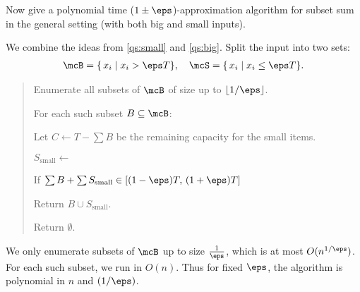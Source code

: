 \documentclass{article}
\begin{document}
\begin{subexercise}
  Now give a polynomial time ($ 1\pm \eps $)-approximation algorithm for subset sum in the general setting (with both big and small inputs).
\end{subexercise}

\begin{solution}
  We combine the ideas from \ref{qs:small} and \ref{qs:big}.
  Split the input into two sets:
  \begin{align*}
    \mcB = \{\,x_i \mid x_i > \eps T\}, \quad \mcS = \{\,x_i \mid x_i \le \eps T\}.
  \end{align*}

  \begin{quote}

  \begin{steps}
    \item Enumerate all subsets of $\mcB$ of size up to $\lfloor 1/\eps \rfloor$.
    \item For each such subset $B \subseteq \mcB$:
    \begin{steps}
      \item Let $C \leftarrow T - \sum B$ be the remaining capacity for the small items.
      \item $ S_{\text{small}} \leftarrow $ 
      \item If $\sum B + \sum S_{\text{small}} \in [(1-\eps)T,\,(1+\eps)T]$ \begin{steps}
        \item Return $B \cup S_{\text{small}}$.
      \end{steps}
    \end{steps}
    \item Return $\emptyset$.
  \end{steps}
  \end{quote}

  \begin{subproof}[Runtime]
  We only enumerate subsets of $\mcB$ up to size $\frac{1}{\eps}$, which is at most $O(n^{1/\eps})$.
  For each such subset, we run  in $O(n)$.
  Thus for fixed $\eps$, the algorithm is polynomial in $n$ and $(1/\eps)$.
  \end{subproof}


\end{solution}
\end{document}

